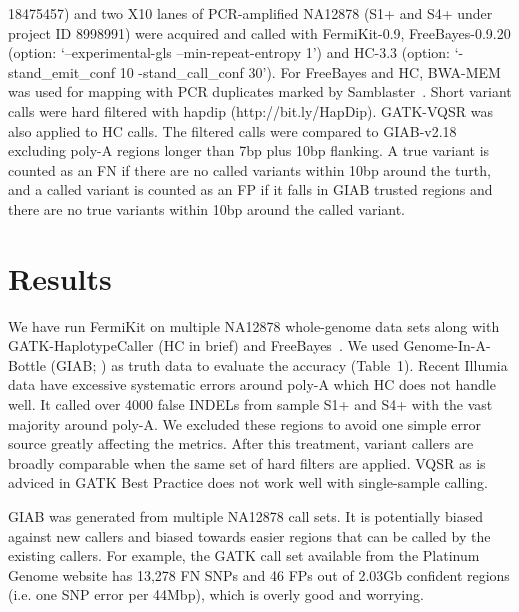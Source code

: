 \documentclass{bioinfo}
\begin{document}
\begin{table}[t]
{18475457) and two X10 lanes of PCR-amplified NA12878 (S1+ and S4+ under project
ID 8998991) were acquired and called with FermiKit-0.9, FreeBayes-0.9.20
(option: `--experimental-gls --min-repeat-entropy 1') and HC-3.3 (option:
`-stand\_emit\_conf 10 -stand\_call\_conf 30'). For FreeBayes and HC, BWA-MEM
was used for mapping with PCR duplicates marked by
Samblaster~\citep{Faust:2014aa}.  Short variant calls were hard filtered with
hapdip (http://bit.ly/HapDip). GATK-VQSR was also applied to HC calls. The
filtered calls were compared to GIAB-v2.18 excluding poly-A regions longer than
7bp plus 10bp flanking. A true variant is counted as an FN if there are no
called variants within 10bp around the turth, and a called variant is counted
as an FP if it falls in GIAB trusted regions and there are no true variants
within 10bp around the called variant.}
\end{table}

\section{Results}
We have run FermiKit on multiple NA12878 whole-genome data sets along with
GATK-HaplotypeCaller (HC in brief) and FreeBayes~\citep{Garrison:2012aa}.
We used Genome-In-A-Bottle (GIAB; \citealt{Zook:2014ab}) as truth data
to evaluate the accuracy (Table~1). Recent Illumia data have excessive
systematic errors around poly-A which HC does not handle well. It called over
4000 false INDELs from sample S1+ and S4+ with the vast majority around poly-A.
We excluded these regions to avoid one simple error source greatly affecting
the metrics. After this treatment, variant callers are broadly comparable when
the same set of hard filters are applied. VQSR as is adviced in GATK Best
Practice does not work well with single-sample calling.

GIAB was generated from multiple NA12878 call sets. It is potentially biased
against new callers and biased towards easier regions that can be called by the
existing callers. For example, the GATK call set available from the Platinum
Genome website has 13,278 FN SNPs and 46 FPs out of 2.03Gb confident regions
(i.e. one SNP error per 44Mbp), which is overly good and worrying.
\end{document}
